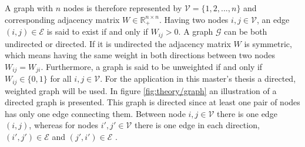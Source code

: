 A graph with $n$ nodes is therefore represented by $\mathcal{V} = \{1, 2, ..., n\}$ and corresponding adjacency matrix $W \in \mathbb{R}_+^{n\times n}$. Having two nodes $i, j \in \mathcal{V}$, an edge $(i,j) \in \mathcal{E}$ is said to exist if and only if $W_{ij} > 0$. A graph $\mathcal{G}$ can be both undirected or directed. If it is undirected the adjacency matrix $W$ is symmetric, which means having the same weight in both directions between two nodes $W_{ij} = W_{ji}$. Furthermore, a graph is said to be unweighted if and only if $W_{ij}\in\{0,1\}$ for all $i,j \in \mathcal{V}$. For the application in this master's thesis a directed, weighted graph will be used. In figure \ref{fig:theory/graph} an illustration of a directed graph is presented. This graph is directed since at least one pair of nodes has only one edge connecting them. Between node $i,j \in \mathcal{V}$ there is one edge $(i,j)$, whereas for nodes $i',j' \in \mathcal{V}$ there is one edge in each direction, $(i',j') \in \mathcal{E}$ and $(j',i') \in \mathcal{E}$ \citep{giacomo}.

